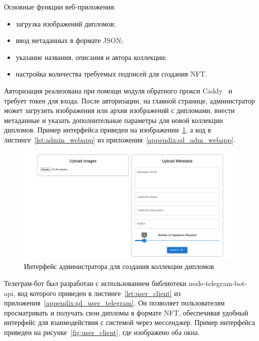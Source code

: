 Основные функции веб-приложения:
\begin{itemize}
    \item загрузка изображений дипломов;
    \item ввод метаданных в формате JSON;
    \item указание названия, описания и автора коллекции;
    \item настройка количества требуемых подписей для создания NFT.
\end{itemize}

Авторизация реализована при помощи модуля обратного прокси Caddy~\cite{bib:caddy} и требует токен для входа. После авторизации, на главной странице, администратор может загрузить изображения или архив изображений с дипломами, внести метаданные и указать дополнительные параметры для новой коллекции дипломов. Пример интерфейса приведен на изображении~\ref{fig:admin_webapp}, а код в листинге~\ref{lst:admin_webapp} из приложения~\ref{appendix:sd_adm_webapp}.

\begin{figure}[H]
	\centering
	\includegraphics[width=1\textwidth]{images/3.admin_webapp.png}
	\parskip=6pt
	\caption{Интерфейс администратора для создания коллекции дипломов}
	\label{fig:admin_webapp}
\end{figure}

Телеграм-бот был разработан с использованием библиотеки node-telegram-bot-api, код которого приведен в листинге~\ref{lst:user_client} из приложения~\ref{appendix:sd_user_telegram}. Он позволяет пользователям просматривать и получать свои дипломы в формате NFT, обеспечивая удобный интерфейс для взаимодействия с системой через мессенджер. Пример интерфейса приведен на рисунке~\ref{fig:user_client}, где изображено оба окна.

